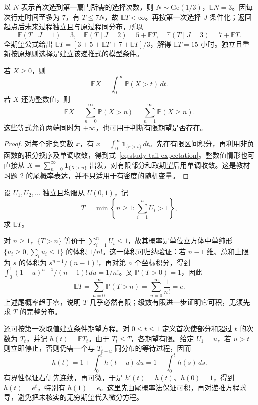 \begin{solve}
以 $N$ 表示首次选到第一扇门所需的选择次数，则 $N\sim\mathrm{Ge}(1/3)$，$\mathbb E N=3$。因每次行走时间至多为 $7$，有 $T\le7N$，故 $\mathbb E T<\infty$。再按第一次选择 $J$ 条件化；返回起点后未来过程独立且与原过程同分布，所以
\[
  \mathbb E(T\mid J=1)=3,\quad
  \mathbb E(T\mid J=2)=5+\mathbb E T,\quad
  \mathbb E(T\mid J=3)=7+\mathbb E T.
\]
全期望公式给出 $\mathbb E T=[3+5+\mathbb E T+7+\mathbb E T]/3$，解得 $\mathbb E T=15$ 小时。独立且重新按原规则选择是建立该递推式的模型条件。
\end{solve}

\begin{proposition}
\label{prop:study-tail-expectation}
若 $X\ge0$，则
\begin{equation}
  \mathbb E X=\int_0^\infty\mathbb P(X>t)\,dt.
  \label{eq:study-tail-expectation}
\end{equation}
若 $X$ 还为整数值，则
\begin{equation}
  \mathbb E X=\sum_{n=0}^{\infty}\mathbb P(X>n)
    =\sum_{n=1}^{\infty}\mathbb P(X\ge n).
  \label{eq:study-integer-tail-expectation}
\end{equation}
这些等式允许两端同时为 $+\infty$，也可用于判断有限期望是否存在。
\end{proposition}

\begin{proof}
对每个非负实数 $x$，有 $x=\int_0^\infty\mathbf1_{\{x>t\}}\,dt$。先在有限区间积分，再利用非负函数的积分换序及单调收敛，得到式~\eqref{eq:study-tail-expectation}。整数值情形也可直接从 $X=\sum_{n=0}^{\infty}\mathbf1_{\{X>n\}}$ 出发，对有限部分和取期望后用单调收敛。这是教材习题 2 的尾概率表达，并不只适用于有密度的随机变量。
\end{proof}

\begin{example}
\label{ex:study-uniform-sum-stopping}
设 $U_1,U_2,\ldots$ 独立且均服从 $U(0,1)$，记
\[
  T=\min\left\{n\ge1:\sum_{i=1}^nU_i>1\right\},
\]
求 $\mathbb E T$。
\end{example}

\begin{solve}
对 $n\ge1$，$\{T>n\}$ 等价于 $\sum_{i=1}^nU_i\le1$，故其概率是单位立方体中单纯形 $\{u_i\ge0,\sum_i u_i\le1\}$ 的体积 $1/n!$。这一体积可归纳验证：若 $n-1$ 维、总和上限为 $s$ 的体积为 $s^{n-1}/(n-1)!$，再对第 $n$ 个坐标积分，得到 $\int_0^1(1-u)^{n-1}/(n-1)!\,du=1/n!$。又 $\mathbb P(T>0)=1$，因此
\[
  \mathbb E T=\sum_{n=0}^{\infty}\mathbb P(T>n)
    =\sum_{n=0}^{\infty}\frac1{n!}=e.
\]
上述尾概率趋于零，说明 $T$ 几乎必然有限；级数有限进一步证明它可积，无须先求 $T$ 的完整分布。

还可按第一次取值建立条件期望方程。对 $0\le t\le1$ 定义首次使部分和超过 $t$ 的次数为 $T_t$，并记 $h(t)=\mathbb E T_t$。由于 $T_t\le T$，各期望有限。给定 $U_1=u$，若 $u>t$ 则立即停止，否则仍需一个与 $T_{t-u}$ 同分布的等待过程，因而
\[
  h(t)=1+\int_0^t h(t-u)\,du=1+\int_0^t h(s)\,ds.
\]
有界性保证右侧先连续，再可微，于是 $h'(t)=h(t)$、$h(0)=1$，得到 $h(t)=e^t$，特别有 $h(1)=e$。这里先由尾概率法保证可积，再对递推方程求导，避免把未核实的无穷期望代入微分方程。
\end{solve}

